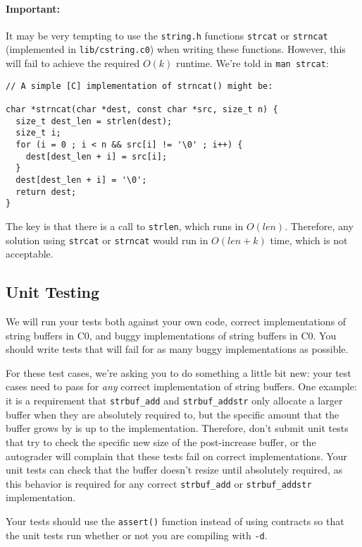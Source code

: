 \documentclass[12pt]{exam}
\begin{document}
\paragraph{Important:}
It may be very tempting to use the
\lstinline[deletekeywords={string}]'string.h' functions
\lstinline'strcat' or \lstinline'strncat' (implemented in
\lstinline'lib/cstring.c0') when writing these functions. However,
this will fail to achieve the required $O(k)$ runtime. We're told in
\lstinline'man strcat':
\begin{lstlisting}
// A simple [C] implementation of strncat() might be:

char *strncat(char *dest, const char *src, size_t n) {
  size_t dest_len = strlen(dest);
  size_t i;
  for (i = 0 ; i < n && src[i] != '\0' ; i++) {
    dest[dest_len + i] = src[i];
  }
  dest[dest_len + i] = '\0';
  return dest;
}
\end{lstlisting}
The key is that there is a call to \lstinline'strlen', which runs in
$O(len)$. Therefore, any solution using \lstinline'strcat' or
\lstinline'strncat' would run in $O(len + k)$ time, which is not
acceptable.

\subsection{Unit Testing}

We will run your tests both against your own code, correct
implementations of string buffers in C0, and buggy implementations of
string buffers in C0. You should write tests that will fail for as
many buggy implementations as possible.

For these test cases, we're asking you to do something a little bit
new: your test cases need to pass for \emph{any} correct
implementation of string buffers.  One example: it is a requirement
that \lstinline'strbuf_add' and \lstinline'strbuf_addstr' only
allocate a larger buffer when they are absolutely required to, but the
specific amount that the buffer grows by is up to the
implementation. Therefore, don't submit unit tests that try to check
the specific new size of the post-increase buffer, or the autograder
will complain that these tests fail on correct implementations. Your
unit tests can check that the buffer doesn't resize until absolutely
required, as this behavior is required for any correct
\lstinline'strbuf_add' or \lstinline'strbuf_addstr' implementation.

Your tests should use the \lstinline'assert()' function instead of
using contracts so that the unit tests run whether or not you are
compiling with \lstinline'-d'.
\end{document}
